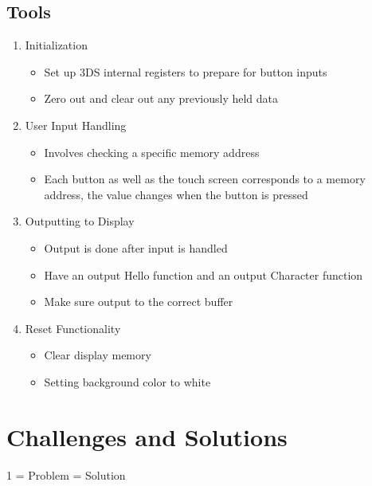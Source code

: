 \documentclass{article}
\begin{document}
\subsection{Tools}
\begin{enumerate}
\item Initialization
    \begin{itemize}
    \item Set up 3DS internal registers to prepare for button inputs
    \item Zero out and clear out any previously held data
    \end{itemize}
\item User Input Handling
    \begin{itemize}
    \item Involves checking a specific memory address
    \item Each button as well as the touch screen corresponds to a memory address, the value changes when the button is pressed
    \end{itemize}
\item Outputting to Display
    \begin{itemize}
    \item Output is done after input is handled
    \item Have an output Hello function and an output Character function
    \item Make sure output to the correct buffer
    \end{itemize}
\item Reset Functionality
    \begin{itemize}
    \item Clear display memory
    \item Setting background color to white
    \end{itemize}
\end{enumerate}


\section{Challenges and Solutions}
1 = Problem  = Solution
\end{document}

